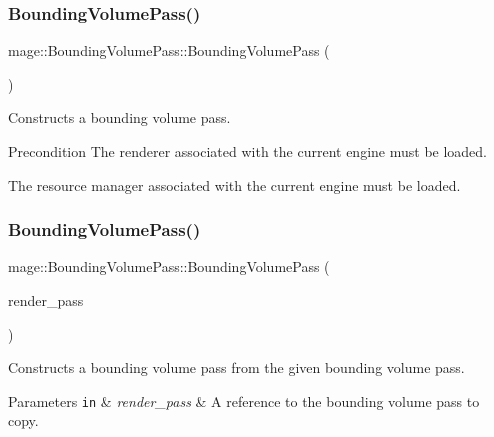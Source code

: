 \subsubsection{\texorpdfstring{Bounding\+Volume\+Pass()}{BoundingVolumePass()}\hspace{0.1cm}{\footnotesize\ttfamily [1/3]}}
{\footnotesize\ttfamily mage\+::\+Bounding\+Volume\+Pass\+::\+Bounding\+Volume\+Pass (\begin{DoxyParamCaption}{ }\end{DoxyParamCaption})}

Constructs a bounding volume pass.

\begin{DoxyPrecond}{Precondition}
The renderer associated with the current engine must be loaded. 

The resource manager associated with the current engine must be loaded. 
\end{DoxyPrecond}
\hypertarget{classmage_1_1_bounding_volume_pass_a21408cc53051c9c6d94efe41b3bea404}{}\label{classmage_1_1_bounding_volume_pass_a21408cc53051c9c6d94efe41b3bea404} 
\subsubsection{\texorpdfstring{Bounding\+Volume\+Pass()}{BoundingVolumePass()}\hspace{0.1cm}{\footnotesize\ttfamily [2/3]}}
{\footnotesize\ttfamily mage\+::\+Bounding\+Volume\+Pass\+::\+Bounding\+Volume\+Pass (\begin{DoxyParamCaption}\item[{const \hyperlink{classmage_1_1_bounding_volume_pass}{Bounding\+Volume\+Pass} \&}]{render\+\_\+pass }\end{DoxyParamCaption})\hspace{0.3cm}{\ttfamily [delete]}}

Constructs a bounding volume pass from the given bounding volume pass.


\begin{DoxyParams}[1]{Parameters}
\mbox{\tt in}  & {\em render\+\_\+pass} & A reference to the bounding volume pass to copy. \\
\hline
\end{DoxyParams}
\hypertarget{classmage_1_1_bounding_volume_pass_a569c5b210bb1135771970ef7ac70c210}{}\label{classmage_1_1_bounding_volume_pass_a569c5b210bb1135771970ef7ac70c210} 
